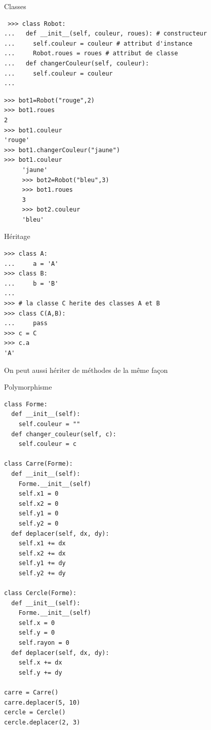 \documentclass{beamer}
\begin{document}
\begin{frame}[fragile]{Classes}
\begin{lstlisting}
 >>> class Robot:
...   def __init__(self, couleur, roues): # constructeur
...     self.couleur = couleur # attribut d'instance
...     Robot.roues = roues # attribut de classe
...   def changerCouleur(self, couleur):
...     self.couleur = couleur
...
\end{lstlisting}
\vspace{-15px}
\begin{lstlisting}[multicols=2, numbers=none] 
>>> bot1=Robot("rouge",2)
>>> bot1.roues
2
>>> bot1.couleur
'rouge'
>>> bot1.changerCouleur("jaune")
>>> bot1.couleur
     'jaune'
     >>> bot2=Robot("bleu",3)
     >>> bot1.roues
     3
     >>> bot2.couleur
     'bleu'
\end{lstlisting}
\end{frame}

\begin{frame}[fragile]{Héritage}
\begin{lstlisting}
>>> class A:
...     a = 'A'
>>> class B:
...     b = 'B'
... 
>>> # la classe C herite des classes A et B
>>> class C(A,B):
...     pass
>>> c = C
>>> c.a
'A'
\end{lstlisting}
On peut aussi hériter de méthodes de la même façon
\end{frame}

\begin{frame}[fragile]{Polymorphisme}
\begin{lstlisting}[multicols=2, basicstyle=\tiny]
class Forme:
  def __init__(self):
    self.couleur = ""
  def changer_couleur(self, c):
    self.couleur = c

class Carre(Forme):
  def __init__(self):
    Forme.__init__(self)
    self.x1 = 0
    self.x2 = 0
    self.y1 = 0
    self.y2 = 0
  def deplacer(self, dx, dy):
    self.x1 += dx
    self.x2 += dx
    self.y1 += dy
    self.y2 += dy

class Cercle(Forme):
  def __init__(self):
    Forme.__init__(self)
    self.x = 0
    self.y = 0
    self.rayon = 0
  def deplacer(self, dx, dy):
    self.x += dx
    self.y += dy

carre = Carre()
carre.deplacer(5, 10)
cercle = Cercle()
cercle.deplacer(2, 3)
\end{lstlisting}
\end{frame}
\end{document}
